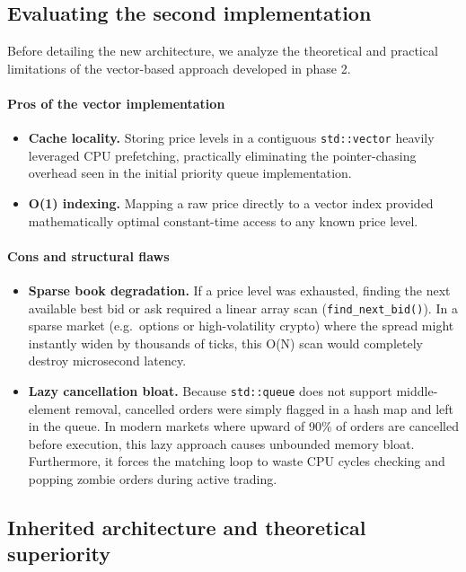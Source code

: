 \documentclass[11pt,a4paper]{article}
\begin{document}
\subsection{Evaluating the second implementation}

Before detailing the new architecture, we analyze the theoretical and
practical limitations of the vector-based approach developed in phase 2.

\paragraph{Pros of the vector implementation}
\begin{itemize}
\item \textbf{Cache locality.} Storing price levels in a contiguous
      \texttt{std::vector} heavily leveraged CPU prefetching, practically
      eliminating the pointer-chasing overhead seen in the initial priority
      queue implementation.
\item \textbf{O(1) indexing.} Mapping a raw price directly to a vector
      index provided mathematically optimal constant-time access to any
      known price level.
\end{itemize}

\paragraph{Cons and structural flaws}
\begin{itemize}
\item \textbf{Sparse book degradation.} If a price level was exhausted,
      finding the next available best bid or ask required a linear array
      scan (\texttt{find\_next\_bid()}). In a sparse market (e.g.\ options
      or high-volatility crypto) where the spread might instantly widen by
      thousands of ticks, this O(N) scan would completely destroy
      microsecond latency.
\item \textbf{Lazy cancellation bloat.} Because \texttt{std::queue} does not
      support middle-element removal, cancelled orders were simply flagged
      in a hash map and left in the queue. In modern markets where upward of
      90\% of orders are cancelled before execution, this lazy approach
      causes unbounded memory bloat. Furthermore, it forces the matching
      loop to waste CPU cycles checking and popping zombie orders during
      active trading.
\end{itemize}

\subsection{Inherited architecture and theoretical superiority}
\end{document}
